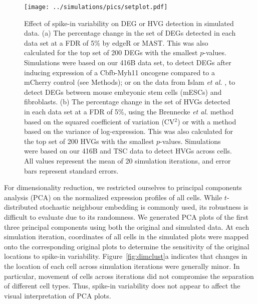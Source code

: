 \documentclass{article}
\begin{document}
\begin{figure}[bt]
    \begin{center}
        \texttt{[image: ../simulations/pics/setplot.pdf]}
    \end{center}
    \caption{Effect of spike-in variability on DEG or HVG detection in simulated data.
        (a) The percentage change in the set of DEGs detected in each data set at a FDR of 5\% by edgeR or MAST.
        This was also calculated for the top set of 200 DEGs with the smallest $p$-values.
        Simulations were based on our 416B data set, to detect DEGs after inducing expression of a Cbfb-Myh11 oncogene compared to a mCherry control (see Methods);
        or on the data from Islam \textit{et al.} \cite{islam2011characterization}, to detect DEGs between mouse embryonic stem cells (mESCs) and fibroblasts.
        (b) The percentage change in the set of HVGs detected in each data set at a FDR of 5\%,
        using the Brennecke \textit{et al.} method based on the squared coefficient of variation (CV$^2$) or with a method based on the variance of log-expression.
        This was also calculated for the top set of 200 HVGs with the smallest $p$-values.
        Simulations were based on our 416B and TSC data to detect HVGs across cells.
        All values represent the mean of 20 simulation iterations, and error bars represent standard errors.
    }
    \label{fig:setchange}
\end{figure}

For dimensionality reduction, we restricted ourselves to principal components analysis (PCA) on the normalized expression profiles of all cells. 
While $t$-distributed stochastic neighbour embedding \cite{van2008visualizing} is commonly used, its robustness is difficult to evaluate due to its randomness.
We generated PCA plots of the first three principal components using both the original and simulated data.
At each simulation iteration, coordinates of all cells in the simulated plots were mapped onto the corresponding original plots to determine the sensitivity of the original locations to spike-in variability.
Figure~\ref{fig:dimclust}a indicates that changes in the location of each cell across simulation iterations were generally minor.
In particular, movement of cells across iterations did not compromise the separation of different cell types. 
Thus, spike-in variability does not appear to affect the visual interpretation of PCA plots.
\end{document}
